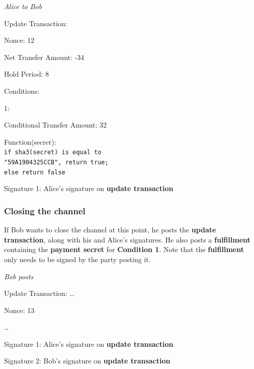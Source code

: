 \documentclass[a4paper]{article}
\newcommand{\bgls}[1]{\textbf{\gls{#1}}}
\newenvironment{mydescription}
{\begin{description}
  \setlength{\itemsep}{5pt}
    \setlength{\parskip}{0pt}
    \setlength{\labelsep}{5pt}
}{
\end{description}}
\begin{document}
\begin{mdframed}[style=message]{\emph{Alice to Bob}}
\begin{mydescription}
  \item[Update Transaction:] \hfill
    \begin{mydescription}
      \item[Nonce:] 12
      \item[Net Transfer Amount:] -34
      \item[Hold Period:] 8
      \item[Conditions:] \hfill
        \begin{mydescription}
          \item[1:] \hfill
            \begin{mydescription}
              \item[Conditional Transfer Amount:] 32
              \item[Function(secret):] \texttt{\\ if sha3(secret) is equal to\\ "59A1904325CCB", return true;\\ else return false}
    \end{mydescription}
      \end{mydescription}
    \end{mydescription}
  \item[Signature 1:] Alice's signature on \bgls{update transaction}
\end{mydescription}
\end{mdframed}

\subsubsection{Closing the channel}

If Bob wants to close the channel at this point, he posts the \bgls{update transaction}, along with his and Alice's signatures. He also posts a \bgls{fulfillment} containing the \bgls{payment secret} for \textbf{Condition 1}. Note that the \bgls{fulfillment} only needs to be signed by the party posting it.

\begin{mdframed}[style=message]{\emph{Bob posts}}
  \begin{mydescription}
    \item[Update Transaction:]\ldots
    \begin{mydescription}
      \item[Nonce:] 13
      \item[\ldots]
    \end{mydescription}
    \item[Signature 1:] Alice's signature on \bgls{update transaction}
    \item[Signature 2:] Bob's signature on \bgls{update transaction}
  \end{mydescription}
\end{mdframed}
\end{document}
